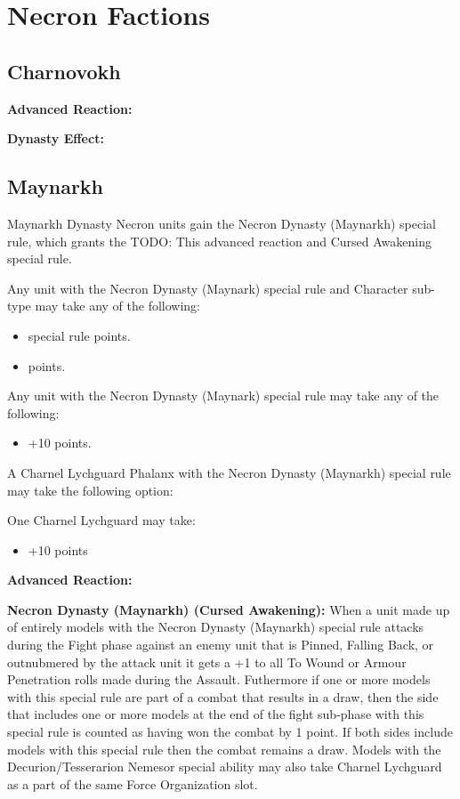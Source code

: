 \section{Necron Factions}

\subsection{Charnovokh}

\textbf{Advanced Reaction:}

\textbf{Dynasty Effect:}


\subsection{Maynarkh}

Maynarkh Dynasty Necron units gain the Necron Dynasty (Maynarkh) special rule, which grants the TODO: This advanced reaction and Cursed Awakening special rule. 

Any unit with the Necron Dynasty (Maynark) special rule and Character sub-type may take any of the following:
\begin{itemize}
	\item {} special rule  points.
	\item {}  points.
\end{itemize}

Any unit with the Necron Dynasty (Maynark) special rule may take any of the following:
\begin{itemize}
	\item {} \dotfill +10 points.
\end{itemize}

A Charnel Lychguard Phalanx with the Necron Dynasty (Maynarkh) special rule may take the following option:

One Charnel Lychguard may take:
\begin{itemize}
	\item {} \dotfill +10 points
\end{itemize} 

\textbf{Advanced Reaction:}

\textbf{Necron Dynasty (Maynarkh) (Cursed Awakening):} When a unit made up of entirely models with the Necron Dynasty (Maynarkh) special rule attacks during the Fight phase against an enemy unit that is Pinned, Falling Back, or outnubmered by the attack unit it gets a +1 to all To Wound or Armour Penetration rolls made during the Assault. Futhermore if one or more models with this special rule are part of a combat that results in a draw, then the side that includes one or more models at the end of the fight sub-phase with this special rule is counted as having won the combat by 1 point. If both sides include models with this special rule then the combat remains a draw. Models with the Decurion/Tesserarion Nemesor special ability may also take Charnel Lychguard as a part of the same Force Organization slot.


